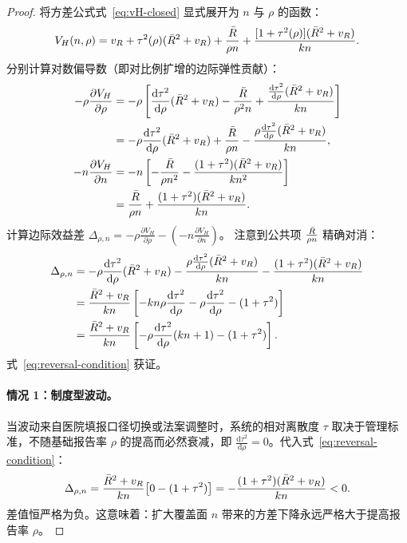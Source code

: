 \begin{proof}
将方差公式式~\eqref{eq:vH-closed} 显式展开为 $n$ 与 $\rho$ 的函数：
\begin{equation}
  V_H(n, \rho) = v_R + \tau^2(\rho)(\bar{R}^2 + v_R) + \frac{\bar{R}}{\rho n} + \frac{[1 + \tau^2(\rho)](\bar{R}^2 + v_R)}{kn}.
\end{equation}
分别计算对数偏导数（即对比例扩增的边际弹性贡献）：
\begin{align}
  -\rho\frac{\partial V_H}{\partial \rho} &= -\rho \left[ \frac{\mathrm{d}\tau^2}{\mathrm{d}\rho}(\bar{R}^2+v_R) - \frac{\bar{R}}{\rho^2 n} + \frac{\frac{\mathrm{d}\tau^2}{\mathrm{d}\rho}(\bar{R}^2+v_R)}{kn} \right] \nonumber \\
  &= -\rho\frac{\mathrm{d}\tau^2}{\mathrm{d}\rho}(\bar{R}^2+v_R) + \frac{\bar{R}}{\rho n} - \frac{\rho\frac{\mathrm{d}\tau^2}{\mathrm{d}\rho}(\bar{R}^2+v_R)}{kn}, \\
  -n\frac{\partial V_H}{\partial n} &= -n \left[ -\frac{\bar{R}}{\rho n^2} - \frac{(1+\tau^2)(\bar{R}^2+v_R)}{kn^2} \right] \nonumber \\
  &= \frac{\bar{R}}{\rho n} + \frac{(1+\tau^2)(\bar{R}^2+v_R)}{kn}.
\end{align}
计算边际效益差 $\Delta_{\rho, n} = -\rho\frac{\partial V_H}{\partial \rho} - (-n\frac{\partial V_H}{\partial n})$。
注意到公共项 $\frac{\bar{R}}{\rho n}$ 精确对消：
\begin{align}
  \Delta_{\rho, n} &= -\rho\frac{\mathrm{d}\tau^2}{\mathrm{d}\rho}(\bar{R}^2+v_R) - \frac{\rho\frac{\mathrm{d}\tau^2}{\mathrm{d}\rho}(\bar{R}^2+v_R)}{kn} - \frac{(1+\tau^2)(\bar{R}^2+v_R)}{kn} \nonumber \\
  &= \frac{\bar{R}^2+v_R}{kn} \left[ -kn\rho\frac{\mathrm{d}\tau^2}{\mathrm{d}\rho} - \rho\frac{\mathrm{d}\tau^2}{\mathrm{d}\rho} - (1+\tau^2) \right] \nonumber \\
  &= \frac{\bar{R}^2+v_R}{kn} \left[ -\rho\frac{\mathrm{d}\tau^2}{\mathrm{d}\rho}(kn + 1) - (1 + \tau^2) \right].
\end{align}
式~\eqref{eq:reversal-condition} 获证。

\paragraph{情况 1：制度型波动。}
当波动来自医院填报口径切换或法案调整时，系统的相对离散度 $\tau$ 取决于管理标准，不随基础报告率 $\rho$ 的提高而必然衰减，即 $\frac{\mathrm{d}\tau^2}{\mathrm{d}\rho} = 0$。代入式~\eqref{eq:reversal-condition}：
\begin{equation}
  \Delta_{\rho, n} = \frac{\bar{R}^2+v_R}{kn} \big[ 0 - (1+\tau^2) \big] = -\frac{(1+\tau^2)(\bar{R}^2+v_R)}{kn} < 0.
\end{equation}
差值恒严格为负。这意味着：扩大覆盖面 $n$ 带来的方差下降永远严格大于提高报告率 $\rho$。


\end{proof}
